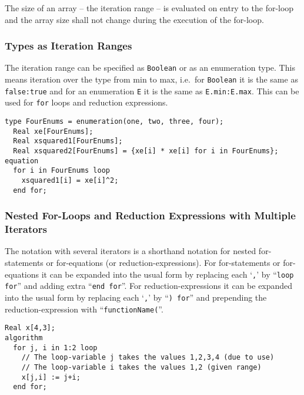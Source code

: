 The size of an array -- the iteration range -- is evaluated on entry to the for-loop and the array size shall not change during the execution of the for-loop.

\subsubsection{Types as Iteration Ranges }\label{types-as-iteration-ranges}

The iteration range can be specified as \lstinline!Boolean! or as an enumeration type.  This means iteration over the type from min to max, i.e.\ for \lstinline!Boolean! it is the same as \lstinline!false:true! and for an enumeration \lstinline!E! it is the same as \lstinline!E.min:E.max!. This can be used for \lstinline!for! loops and reduction expressions.

\begin{example}
\begin{lstlisting}[language=modelica]
  type FourEnums = enumeration(one, two, three, four);
  Real xe[FourEnums];
  Real xsquared1[FourEnums];
  Real xsquared2[FourEnums] = {xe[i] * xe[i] for i in FourEnums};
equation
  for i in FourEnums loop
    xsquared1[i] = xe[i]^2;
  end for;
\end{lstlisting}
\end{example}

\subsubsection{Nested For-Loops and Reduction Expressions with Multiple Iterators}\label{nested-for-loops-and-reduction-expressions-with-multiple-iterators}

The notation with several iterators is a shorthand notation for nested
for-statements or for-equations (or reduction-expressions). For
for-statements or for-equations it can be expanded into the usual form
by replacing each `\lstinline!,!' by ``\lstinline!loop for!'' and adding extra ``\lstinline!end for!''. For
reduction-expressions it can be expanded into the usual form by
replacing each `\lstinline!,!' by ``\lstinline!) for!'' and prepending the reduction-expression
with ``\lstinline!functionName(!''.

\begin{example}
\begin{lstlisting}[language=modelica]
  Real x[4,3];
algorithm
  for j, i in 1:2 loop
    // The loop-variable j takes the values 1,2,3,4 (due to use)
    // The loop-variable i takes the values 1,2 (given range)
    x[j,i] := j+i;
  end for;
\end{lstlisting}
\end{example}


